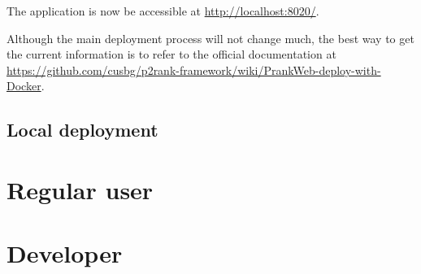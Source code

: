 The application is now be accessible at \url{http://localhost:8020/}.

Although the main deployment process will not change much, the best way to get the current information is to refer to the official documentation at \url{https://github.com/cusbg/p2rank-framework/wiki/PrankWeb-deploy-with-Docker}.

\subsection{Local deployment}
\label{subsec:local_deployment}


\section{Regular user}
\label{sec:regular_user}

\section{Developer}
\label{sec:developer}
